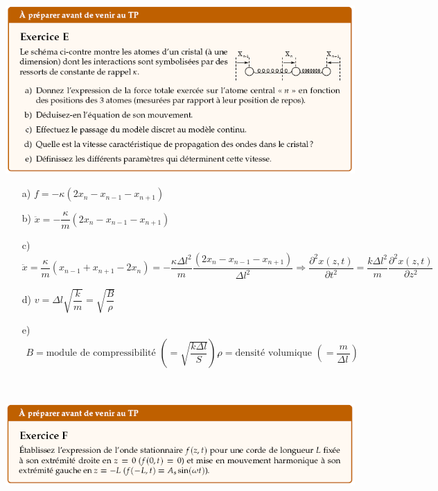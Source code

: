 \documentclass	[11pt, a4paper, openany]{book}
\begin{document}
\begin{center}
\includegraphics[scale=0.85]{prepa/Ondes-E.png}\\
\end{center}

\begin{itemize}
\item[a) ]$f=-\kappa(2x_n-x_{n-1}-x_{n+1})$
\item[b) ]$\ddot{x}=-\dfrac{\kappa}{m}(2x_n-x_{n-1}-x_{n+1})$

\item[c) ]$\ddot{x}=\dfrac{\kappa}{m}(x_{n-1}+x_{n+1}-2x_n)=-\dfrac{\kappa\Delta l^2}{m}\dfrac{(2x_n-x_{n-1}-x_{n+1})}{\Delta l^2}\Rightarrow\dfrac{\partial^2 x(z,t)}{\partial t^2}=\dfrac{k\Delta l^2}{m}\dfrac{\partial^2x(z,t)}{\partial z^2}$

\item[d) ]$v=\Delta l\sqrt{\dfrac{k}{m}}=\sqrt{\dfrac{B}{\rho}}$

\item[e) ]$\begin{array}{lr}
B=\text{module de compressibilité }\left(=\sqrt{\dfrac{k\Delta l}{S}}\right),  & \rho=\text{densité volumique }\left(=\dfrac{m}{\Delta l\,}\right)
\end{array}$
\end{itemize}
\
\begin{center}
\includegraphics[scale=0.85]{prepa/Ondes-F.png}\\
\end{center}
\end{document}
